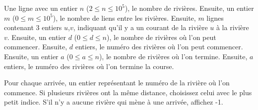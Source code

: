 \begin{Input}
    Une ligne avec un entier $n$ ($2 \le n \le 10^5$), le nombre de rivières.
    Ensuite, un entier $m$ ($0 \le m \le 10^5$), le nombre de liens entre les rivières.
    Ensuite, $m$ lignes contenant 3 entiers $u$,$v$, indiquant qu'il y a un courant de la rivière $u$ à la rivière $v$.
    Ensuite, un entier $d$ ($ 0 \le d \le n$), le nombre de rivières où l'on peut commencer.
    Ensuite, $d$ entiers, le numéro des rivières où l'on peut commencer.
    Ensuite, un entier $a$ ($ 0 \le a \le n$), le nombre de rivières où l'on termine.
    Ensuite, $a$ entiers, le numéro des rivières où l'on termine la course. 
\end{Input}

\begin{Output}
    Pour chaque arrivée, un entier représentant le numéro de la rivière où l'on commence. Si plusieurs rivières ont la même distance, choisissez celui avec le plus petit indice.
    S'il n'y a aucune rivière qui mène à une arrivée, affichez -1.
\end{Output}
